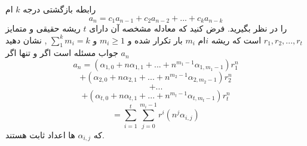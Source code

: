 \EXERCISE
{}
رابطه‌ بازگشتی درجه 
$k$
ام
\[a_n=c_{1}a_{n-1}+c_{2}a_{n-2}+...+c_{k}a_{n-k}\]
را در نظر بگیرید. فرض کنید که معادله مشخصه آن دارای 
$t$
ریشه حقیقی و متمایز 
$r_1, r_2, ..., r_t $
است که ریشه
$i$ام 
$m_i$
بار تکرار شده و  
$m_i \geq 1$
و
$\sum_1^k m_i=k$
,
نشان دهید
$a_n$
جواب مسئله است اگر و تنها اگر
\[a_n=(\alpha_{1,0}+ n\alpha_{1,1} + ... + n^{m_1-1}\alpha_{1,m_1-1})r_1^n\]
\[+(\alpha_{2,0}+ n\alpha_{2,1} + ... + n^{m_2-1}\alpha_{2,m_2-1})r_2^n\]
\[+...\]
\[+ (\alpha_{t,0} + n\alpha_{t,1} + ... + n^{m_t-1}\alpha_{t,m_t-1})r_t^n\]
\[=\sum_{i=1}^t\sum_{j=0}^{m_i-1}r^i(n^j\alpha_{i,j})\]
که
$\alpha_{i,j}$
ها
اعداد ثابت هستند.


